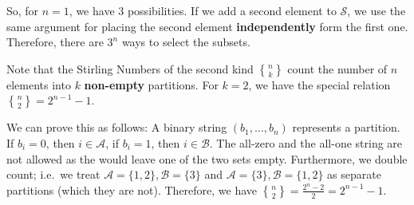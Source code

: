 So, for \(n=1\), we have \(3\) possibilities. If we add a second element to \(\mathcal{S}\), we use the same argument for placing the second element \textbf{independently} form the first one. Therefore, there are \(3^n\) ways to select the subsets.

Note that the Stirling Numbers of the second kind \({n \brace k}\) count the number of \(n\) elements into \(k\) \textbf{non-empty} partitions. For \(k=2\), we have the special relation \({n \brace 2} = 2^{n-1}-1\).

We can prove this as follows: A binary string \((b_1, \ldots,b_n)\)
represents a partition. If \(b_i = 0\), then \(i \in \mathcal{A}\), if \(b_i = 1\), then \(i \in \mathcal{B}\). The all-zero and the all-one string are not allowed as the would leave one of the two sets empty. Furthermore, we double count; i.e.~we treat
\(\mathcal{A} = \{1,2\}, \mathcal{B} = \{3\}\) and \(\mathcal{A} = \{3\}, \mathcal{B} = \{1,2\}\) as separate partitions (which they are not). Therefore, we have \({n \brace 2} = \frac{2^{n}-2}{2} = 2^{n-1}-1\).

